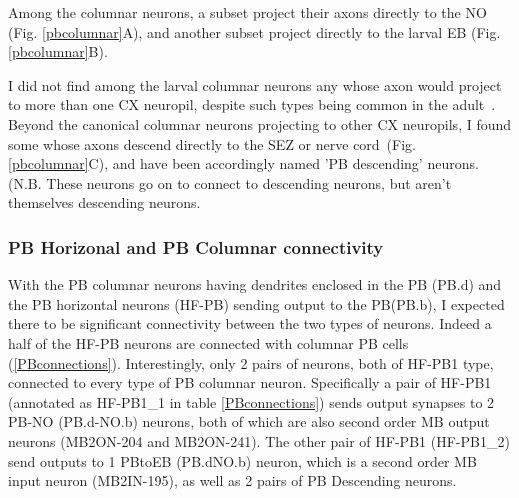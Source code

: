     Among the columnar neurons, a subset project their axons directly to the NO (Fig. \ref{pbcolumnar}A), and another subset project directly to the larval EB (Fig. \ref{pbcolumnar}B).

    I did not find among the larval columnar neurons any whose axon would project to more than one CX neuropil, despite such types being common in the adult~\citep{wolff2015neuroarchitecture, wolff2018neuroarchitecture, hulse2021connectome}.
    Beyond the canonical columnar neurons projecting to other CX neuropils, I found some whose axons descend directly to the SEZ or nerve cord~(Fig. \ref{pbcolumnar}C), and have been accordingly named 'PB descending' neurons. (N.B. These neurons go on to connect to descending neurons, but aren't themselves descending neurons.

    \subsubsection{PB Horizonal and PB Columnar connectivity}
    With the PB columnar neurons having dendrites enclosed in the PB (PB.d) and the PB horizontal neurons (HF-PB) sending output to the PB(PB.b), I expected there to be significant connectivity between the two types of neurons. Indeed a half of the HF-PB neurons are connected with columnar PB cells (\ref{PBconnections}).  Interestingly, only 2 pairs of neurons, both of HF-PB1 type, connected to every type of PB columnar neuron. Specifically a pair of HF-PB1 (annotated as HF-PB1\_1 in table \ref{PBconnections}) sends output synapses to 2 PB-NO (PB.d-NO.b) neurons, both of which are also second order MB output neurons (MB2ON-204 and MB2ON-241). The other pair of  HF-PB1 (HF-PB1\_2) send outputs to 1 PBtoEB (PB.dNO.b) neuron, which is a second order MB input neuron (MB2IN-195), as well as 2 pairs of PB Descending neurons. 


